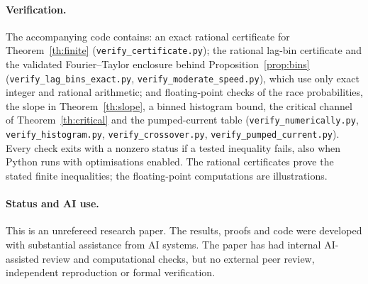 \documentclass[11pt,a4paper]{article}
\begin{document}
\paragraph{Verification.} The accompanying code contains: an exact rational certificate for Theorem~\ref{th:finite} (\texttt{verify\_certificate.py}); the rational lag-bin certificate and the validated Fourier--Taylor enclosure behind Proposition~\ref{prop:bins} (\texttt{verify\_lag\_bins\_exact.py}, \texttt{verify\_moderate\_speed.py}), which use only exact integer and rational arithmetic; and floating-point checks of the race probabilities, the slope in Theorem~\ref{th:slope}, a binned histogram bound, the critical channel of Theorem~\ref{th:critical} and the pumped-current table (\texttt{verify\_numerically.py}, \texttt{verify\_histogram.py}, \texttt{verify\_crossover.py}, \texttt{verify\_pumped\_current.py}). Every check exits with a nonzero status if a tested inequality fails, also when Python runs with optimisations enabled. The rational certificates prove the stated finite inequalities; the floating-point computations are illustrations.

\paragraph{Status and AI use.} This is an unrefereed research paper. The results, proofs and code were developed with substantial assistance from AI systems. The paper has had internal AI-assisted review and computational checks, but no external peer review, independent reproduction or formal verification.
\end{document}
